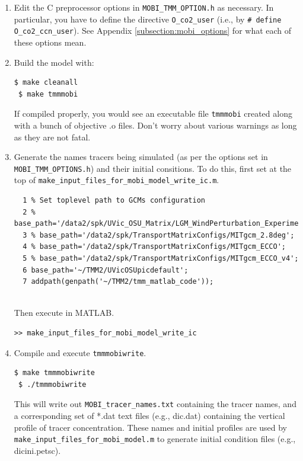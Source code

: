 \documentclass[a4paper]{article}
\def\noin{\noindent }
\begin{document}
\begin{enumerate}
\item Edit the C preprocessor options in \verb|MOBI_TMM_OPTION.h| as necessary. In particular, you have to define the directive \verb|O_co2_user| (i.e., by \verb|# define O_co2_ccn_user|). See Appendix \ref{subsection:mobi_options} for what each of these options mean. 

\item Build the model with:
\begin{lstlisting}[style=DOS]
 $ make cleanall
 $ make tmmmobi
\end{lstlisting}
\noin If compiled properly, you would see an executable file \verb|tmmmobi| created along with a bunch of objective .o files. Don't worry about various warnings as long as they are not fatal. 

\item Generate the names tracers being simulated (as per the options set in \verb|MOBI_TMM_OPTIONS.h|) and their initial consitions. To do this, first set at the top of \verb|make_input_files_for_mobi_model_write_ic.m|. 
\lstset{language=matlab} 
\begin{lstlisting}[frame=single,basicstyle=\scriptsize,commentstyle=\color{blue}]
 % make_input_files_for_mobi_model_write_ic.m
  1 % Set toplevel path to GCMs configuration
  2 % base_path='/data2/spk/UVic_OSU_Matrix/LGM_WindPerturbation_Experiments/no_embm_awind2/picdefault';
  3 % base_path='/data2/spk/TransportMatrixConfigs/MITgcm_2.8deg';
  4 % base_path='/data2/spk/TransportMatrixConfigs/MITgcm_ECCO';
  5 % base_path='/data2/spk/TransportMatrixConfigs/MITgcm_ECCO_v4';
  6 base_path='~/TMM2/UVicOSUpicdefault';
  7 addpath(genpath('~/TMM2/tmm_matlab_code'));
 
\end{lstlisting}
\noin Then execute in MATLAB.
\begin{lstlisting}[style=DOS]
 >> make_input_files_for_mobi_model_write_ic
\end{lstlisting}

\item Compile and execute \verb|tmmmobiwrite|. 
\begin{lstlisting}[style=DOS]
 $ make tmmmobiwrite
 $ ./tmmmobiwrite
\end{lstlisting}
\noin This will write out \verb|MOBI_tracer_names.txt| containing the tracer names, and a corresponding set of *.dat text files (e.g., dic.dat) containing the vertical profile of tracer concentration. These names and initial profiles are used by \verb|make_input_files_for_mobi_model.m| to generate initial condition files (e.g., dicini.petsc). 


\end{enumerate}
\end{document}
